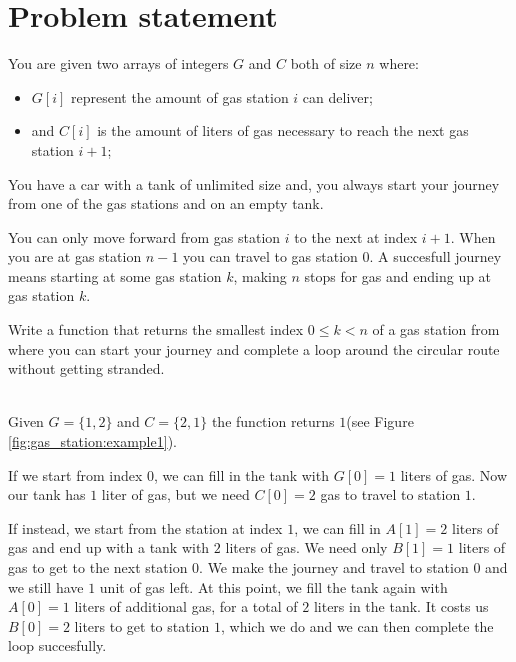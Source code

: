 \section{Problem statement}
\begin{exercise}
\label{example:gas_station:exercice1}
You are given two arrays of integers $G$ and $C$ both of size $n$ 
where:
\begin{itemize}
	\item $G[i]$ represent the amount of gas station $i$ can deliver;
	\item and $C[i]$ is the amount of liters of gas necessary to reach the next gas station $i+1$;
\end{itemize}

You have a car with a tank of unlimited size and, you always start your journey from one of the gas stations and on an empty tank. 

You can only move forward from gas station $i$ to the next at index $i+1$. When you are at gas station $n-1$ you can travel to gas station $0$. 
A succesfull journey means starting at some gas station $k$, making $n$ stops for gas and ending up at gas station $k$.

Write a function that returns the smallest index $0 \leq k < n$ of a gas station from where you can start your journey and complete a loop around the circular route without getting stranded.

	\begin{example}
		\label{example:gas_station:example1}
		\hfill \\
		Given $G=\{1,2\}$ and $C=\{2,1\}$ the function returns $1$(see Figure \ref{fig:gas_station:example1}).

		
        If we start from index $0$, we can fill in the tank with $G[0] = 1$ liters of gas. 
		Now our tank has $1$ liter of gas,	but we need $C[0] = 2$ gas to travel to station $1$. 
        
		If instead, we start from the station at index $1$, we can fill in $A[1] = 2$ liters of gas and end up with a tank with $2$ liters of gas. 
		We need only $B[1] = 1$ liters of gas to get to the next station $0$.
		We make the journey and travel to station $0$ and we still have $1$ unit of gas left. 
		At this point, we fill the tank again with $A[0] = 1$ liters of additional gas, for a total of $2$ liters in the tank. 
		It costs us $B[0] = 2$ liters to get to station $1$, which we do and we can then complete the loop succesfully. 
	\end{example}


\end{exercise}
